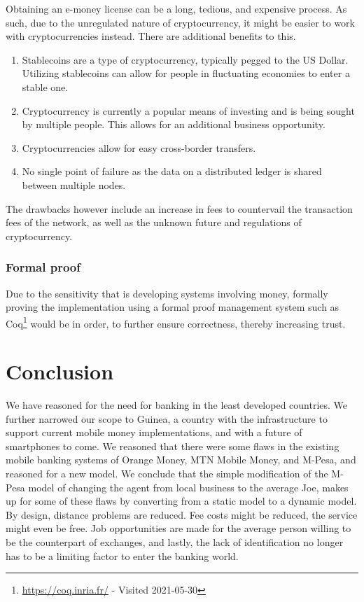 \documentclass[11pt, a4paper]{article}
\begin{document}
\label{sub:blockchain_technology}

Obtaining an e-money license can be a long, tedious, and expensive process. As such, due to the unregulated nature of cryptocurrency, it might be easier to work with cryptocurrencies instead. There are additional benefits to this.
\begin{enumerate}
  \item Stablecoins are a type of cryptocurrency, typically pegged to the US Dollar. Utilizing stablecoins can allow for people in fluctuating economies to enter a stable one.
  \item Cryptocurrency is currently a popular means of investing and is being sought by multiple people. This allows for an additional business opportunity.
  \item Cryptocurrencies allow for easy cross-border transfers.
  \item No single point of failure as the data on a distributed ledger is shared between multiple nodes.
\end{enumerate}
The drawbacks however include an increase in fees to countervail the transaction fees of the network, as well as the unknown future and regulations of cryptocurrency.

\subsubsection{Formal proof} %
\label{sub:formal_proof}
Due to the sensitivity that is developing systems involving money, formally proving the implementation using a formal proof management system such as Coq\footnote{\url{https://coq.inria.fr/} - Visited 2021-05-30} would be in order, to further ensure correctness, thereby increasing trust.

\section{Conclusion}
We have reasoned for the need for banking in the least developed countries. We further narrowed our scope to Guinea, a country with the infrastructure to support current mobile money implementations, and with a future of smartphones to come. We reasoned that there were some flaws in the existing mobile banking systems of Orange Money, MTN Mobile Money, and M-Pesa, and reasoned for a new model. We conclude that the simple modification of the M-Pesa model of changing the agent from local business to the average Joe, makes up for some of these flaws by converting from a static model to a dynamic model. By design, distance problems are reduced. Fee costs might be reduced, the service might even be free. Job opportunities are made for the average person willing to be the counterpart of exchanges, and lastly, the lack of identification no longer has to be a limiting factor to enter the banking world.
\end{document}
